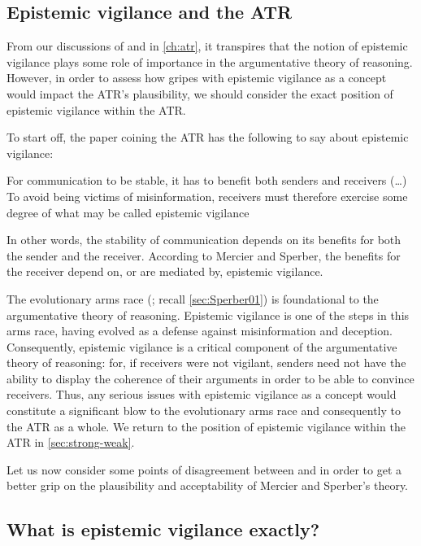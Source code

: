 \subsection{Epistemic vigilance and the ATR}
\label{sec:epi-vigil-atr}

From our discussions of \citet{Sperber10} and \citet{MS11} in \cref{ch:atr}, it transpires that the notion of epistemic vigilance plays some role of importance in the argumentative theory of reasoning. However, in order to assess how gripes with epistemic vigilance as a concept would impact the ATR's plausibility, we should consider the exact position of epistemic vigilance within the ATR.

To start off, the paper coining the ATR has the following to say about epistemic vigilance:

\begin{quoting}
    For communication to be stable, it has to benefit both senders and receivers (\ldots) To avoid being victims of misinformation, receivers must therefore exercise some degree of what may be called epistemic vigilance
    \hfill \citep[p.~60]{MS11}
\end{quoting}
In other words, the stability of communication depends on its benefits for both the sender and the receiver. According to Mercier and Sperber, the benefits for the receiver depend on, or are mediated by, epistemic vigilance.

The evolutionary arms race (\citealp{Sperber01}; recall \cref{sec:Sperber01}) is foundational to the argumentative theory of reasoning. Epistemic vigilance is one of the steps in this arms race, having evolved as a defense against misinformation and deception. Consequently, epistemic vigilance is a critical component of the argumentative theory of reasoning: for, if receivers were not vigilant, senders need not have the ability to display the coherence of their arguments in order to be able to convince receivers. Thus, any serious issues with epistemic vigilance as a concept would constitute a significant blow to the evolutionary arms race and consequently to the ATR as a whole. We return to the position of epistemic vigilance within the ATR in \cref{sec:strong-weak}.

Let us now consider some points of disagreement between \citet{Michaelian13} and \citet{Sperber10} in order to get a better grip on the plausibility and acceptability of Mercier and Sperber's theory.

\subsection{What is epistemic vigilance exactly?}
\label{sec:EV-def}

